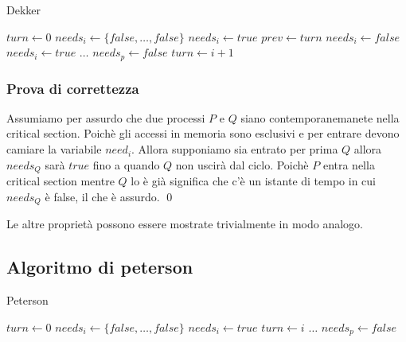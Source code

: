 \documentclass{article}
\begin{document}
\begin{algorithm}[H]
  \caption{Dekker}
  \begin{algorithmic}[0]
    \State $turn \gets 0$
    \State $needs_i \gets \{false, \ldots, false\}$
        \State $needs_i \gets true$
            \State $prev \gets turn$
            \State $needs_i \gets false$
            \EndWhile
            \State $needs_i \gets true$
          \EndIf
        \EndWhile
        \State $\ldots$
        \State $needs_p \gets false$
        \State $turn \gets i+1$
      \EndWhile
    \EndProcedure
  \end{algorithmic}
\end{algorithm}

\subsubsection{Prova di correttezza}

Assumiamo per assurdo che due processi $P$ e $Q$ siano contemporanemanete nella
critical section. Poich\`e gli accessi in memoria sono esclusivi e per entrare
devono camiare la variabile $need_i$. Allora supponiamo sia entrato per prima
$Q$ allora $needs_Q$ sar\`a $true$ fino a quando $Q$ non uscir\`a dal ciclo.
Poich\`e $P$ entra nella critical section mentre $Q$ lo \`e gi\`a significa che
c'\`e un istante di tempo in cui $needs_Q$ \`e false, il che \`e assurdo. \qed

Le altre propriet\`a possono essere mostrate trivialmente in modo analogo.

\subsection{Algoritmo di peterson}

\begin{algorithm}[H]
  \caption{Peterson}
  \begin{algorithmic}[0]
    \State $turn \gets 0$
    \State $needs_i \gets \{false, \ldots, false\}$
        \State $needs_i \gets true$
        \State $turn \gets i$
        \EndWhile
        \State $\ldots$
        \State $needs_p \gets false$
      \EndWhile
    \EndProcedure
  \end{algorithmic}
\end{algorithm}
\end{document}
